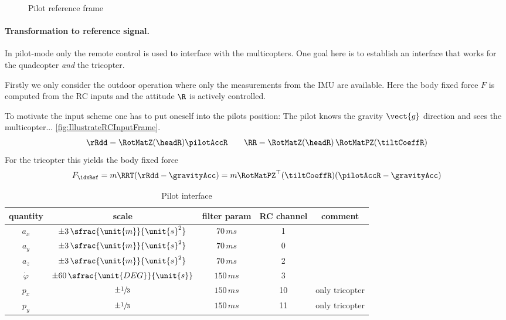 \begin{figure}[ht]
 \centering
 
 \caption{Pilot reference frame}
 \label{fig:IllustrateRCInputFrame}
\end{figure}


\paragraph{Transformation to reference signal.}
In pilot-mode only the remote control is used to interface with the multicopters.
One goal here is to establish an interface that works for the quadcopter \textit{and} the tricopter.

Firstly we only consider the outdoor operation where only the measurements from the IMU are available.
Here the body fixed force $F$ is computed from the RC inputs and the attitude $\R$ is actively controlled. 

To motivate the input scheme one has to put oneself into the pilots position:
The pilot knows the gravity $\vect{g}$ direction and sees the multicopter... \autoref{fig:IllustrateRCInputFrame}.
\begin{align}
 \rRdd = \RotMatZ(\headR) \pilotAccR
\qquad
 \RR = \RotMatZ(\headR)\, \RotMatPZ(\tiltCoeffR)
\end{align}
For the tricopter this yields the body fixed force
\begin{align}
 F_{\idxRef} = m \RRT (\rRdd - \gravityAcc) = m \RotMatPZ^\top(\tiltCoeffR) (\pilotAccR - \gravityAcc)
\end{align}



\begin{table}[ht]
\centering
\begin{tabular}{ccccc}
 \toprule
 quantity & scale & filter param & RC channel & comment\\
 \midrule
 $a_x$ & $\pm 3\,\sfrac{\unit{m}}{\unit{s}^2}$ & $70\,\unit{ms}$ & 1 \\
 $a_y$ & $\pm 3\,\sfrac{\unit{m}}{\unit{s}^2}$ & $70\,\unit{ms}$ & 0 \\
 $a_z$ & $\pm 3\,\sfrac{\unit{m}}{\unit{s}^2}$ & $70\,\unit{ms}$ & 2 \\
 $\dot{\varphi}$ & $\pm 60\,\sfrac{\unit{DEG}}{\unit{s}}$ & $150\,\unit{ms}$ & 3 \\
 $p_x$ & $\pm \sfrac{1}{3}$ & $150\,\unit{ms}$ & 10 & only tricopter \\
 $p_y$ & $\pm \sfrac{1}{3}$ & $150\,\unit{ms}$ & 11 & only tricopter \\
 \bottomrule
\end{tabular}
\caption{Pilot interface}
\label{tab:PilotInterface}
\end{table}


